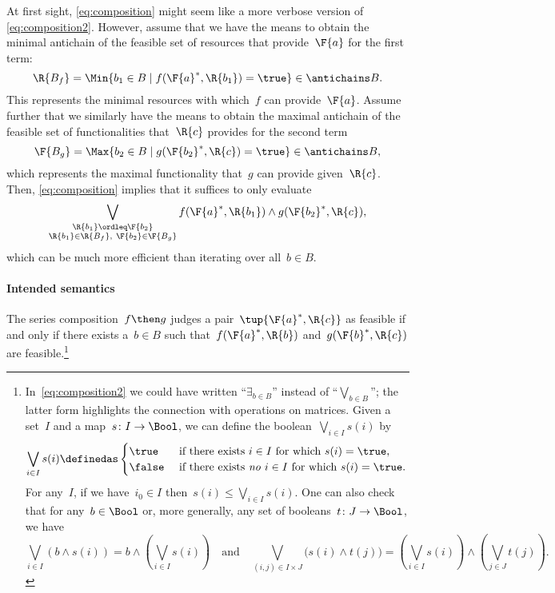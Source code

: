 \begin{remark}
  At first sight, \cref{eq:composition} might seem like a more verbose version of \cref{eq:composition2}. However, assume that we have the means to obtain the minimal antichain of the feasible set of resources that provide~$\F{a}$ for the first term:
  \begin{equation*}
    \R{B_f} = \Min \{b_1\in B \mid f(\F{a}^*,\R{b_1})=\true\} \in \antichains B.
  \end{equation*}
  This represents the minimal resources with which~$f$ can provide~$\F{a}$. Assume further that we similarly have the means to obtain the maximal antichain of the feasible set of functionalities that~$\R{c}$ provides for the second term
  \begin{equation*}
    \F{B_g} = \Max \{b_2\in B \mid g(\F{b_2}^*,\R{c})=\true\} \in \antichains B,
  \end{equation*}
  which represents the maximal functionality that~$g$ can provide given~$\R{c}$. Then, \cref{eq:composition} implies that it suffices to only evaluate
  \begin{equation*}
    \bigvee_{\substack{\R{b_1}\ordleq\F{b_2} \\ \R{b_1}\in \R{B_f},~ \F{b_2}\in\F{B_g} }} f(\F{a}^*,\R{b_1}) \wedge g(\F{b_2}^*,\R{c}),
  \end{equation*}
  which can be much more efficient than iterating over all~$b\in B$.
\end{remark}

\paragraph{Intended semantics}
The series composition~$f\then g$ judges a pair~$\tup{\F{a}^*,\R{c}}$ as feasible if and only if there exists a~$b \in B$ such that~$f(\F{a}^*,\R{b})$ and~$g(\F{b}^*,\R{c})$ are feasible.\footnote{In~\cref{eq:composition2} we could have written ``$\exists_{b\in B}$'' instead of ``$\bigvee_{b\in B}$''; the latter form highlights the connection with operations on matrices. Given a set~$I$ and a map~$s\colon I\to\Bool$, we can define the boolean~$\bigvee_{i\in I}s(i)$ by
  \begin{equation*}
    \bigvee_{i\in I}s(i)\definedas
    \begin{cases}
      \true&\text{ if there exists }i\in I\text{ for which }s(i)=\true,\\
      \false&\text{ if there exists \emph{no} }i\in I\text{ for which }s(i)=\true.
    \end{cases}
  \end{equation*}
  For any~$I$, if we have~$i_0\in I$ then~$s(i)\leq\bigvee_{i\in I}s(i)$. One can also check that for any~$b\in\Bool$ or, more generally, any set of booleans~$t\colon J\to\Bool$, we have
  \begin{equation*}
    \bigvee_{i\in I}(b\wedge s(i))=b\wedge\left(\bigvee_{i\in I}s(i)\right)
    \quad\text{and}\quad
    \bigvee_{(i,j)\in I\times  J}\big(s(i)\wedge t(j)\big)=\left(\bigvee_{i\in I}s(i)\right)\wedge\left(\bigvee_{j\in J} t(j)\right).
  \end{equation*}
}

